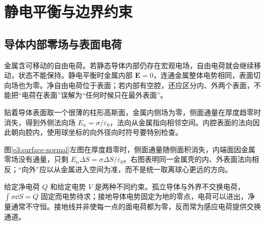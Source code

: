 \section{静电平衡与边界约束}
\subsection{导体内部零场与表面电荷}

金属含可移动的自由电荷。若静态导体内部仍存在宏观电场，自由电荷就会继续移动，状态不能保持。静电平衡时金属内部 $\bm E=0$，连通金属整体电势相同，表面切向场也为零。净自由电荷位于表面；若内部有空腔，还应区分内、外两个表面，不能把“电荷在表面”误解为“任何时候只在最外表面”。

贴着导体表面取一个很薄的柱形高斯面，金属内侧场为零，侧面通量在厚度趋零时消失，得到外侧法向场 $E_n=\sigma/\varepsilon_0$，法向从金属指向相邻空间。内腔表面的法向因此朝向腔内，使用球坐标的向外径向时符号要特别检查。


图\ref{e3:surface-normal}左图在厚度趋零时，侧面通量随侧面积消失，内端面因金属零场没有通量，只剩 $E_n\Delta S=\sigma\Delta S/\varepsilon_0$。右图表明同一金属壳的内、外表面法向相反；“向外”应以从金属进入空间为准，而不是统一取离球心更远的方向。

给定净电荷 $Q$ 和给定电势 $V$ 是两种不同约束。孤立导体与外界不交换电荷，$\int\sigma\dd S=Q$ 固定而电势待求；接地导体电势固定为地的零点，电荷可以进出，净量通常不守恒。接地线并非使每一点的面电荷都为零，反而常为感应电荷提供交换通道。

